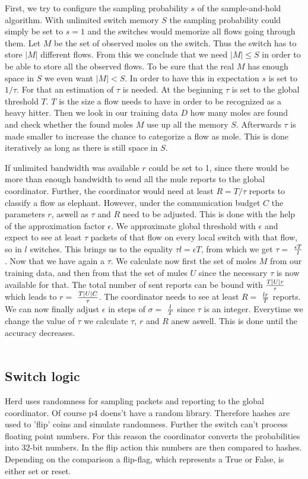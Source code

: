 \documentclass[11pt,oneside,a4paper]{article}
\begin{document}
First, we try to configure the sampling probability $s$ of the sample-and-hold algorithm. With unlimited switch memory $S$ the sampling probability could simply be set to $s=1$ and the switches would memorize all flows going through them. Let $M$ be the set of observed moles on the switch. Thus the switch has to store $|M|$ different flows. From this we conclude that we need $|M| \leq S$ in order to be able to store all the observed flows. To be sure that the real $M$ has enough space in $S$ we even want $|M| < S$. In order to have this in expectation $s$ is set to $1/\tau$. For that an estimation of $\tau$ is needed. At the beginning $\tau$ is set to the global threshold $T$. $T$ is the size a flow needs to have in order to be recognized as a heavy hitter. Then we look in our training data $D$ how many moles are found and check whether the found moles $M$ use up all the memory $S$. Afterwards $\tau$ is made smaller to increase the chance to categorize a flow as mole. This is done iteratively as long as there is still space in $S$. 

If unlimited bandwidth was available $r$ could be set to 1, since there would be more than enough bandwidth to send all the mule reports to the global coordinator. Further, the coordinator would need at least $R = T/\tau$ reports to classify a flow as elephant. However, under the communication budget $C$ the parameters $r$, aswell as $\tau$ and $R$ need to be adjusted. This is done with the help of the approximation factor $\epsilon$. We approximate global threshold with $\epsilon$ and expect to see at least $\tau$ packets of that flow on every local switch with that flow, so in $l$ switches. This brings us to the equality $\tau l = \epsilon T$, from which we get $\tau =$ $\epsilon T\over l$. Now that we have again a $\tau$. We calculate now first the set of moles $M$ from our training data, and then from that the set of mules $U$ since the necessary $\tau$ is now available for that. The total number of sent reports can be bound with $T|U|r\over \tau$ which leads to $r =$ $T|U|C\over \tau$. The coordinator needs to see at least $R =$ $lr\over T$ reports. We can now finally adjust $\epsilon$ in steps of $\sigma =$ $l\over T$ since $\tau$ is an integer. Everytime we change the value of $\tau$ we calculate $\tau$, $r$ and $R$ anew aswell. This is done until the accuracy decreases.\\\\


\subsection{Switch logic} \label{switch}
Herd uses randomness for sampling packets and reporting to the global coordinator. Of course p4 doens't have a random library. Therefore hashes are used to 'flip' coins and simulate randomness. Further the switch can't process floating point numbers. For this reason the coordinator converts the probabilities into 32-bit numbers. In the flip action this numbers are then compared to hashes. Depending on the comparison a flip-flag, which represents a True or False, is either set or reset.
\end{document}
